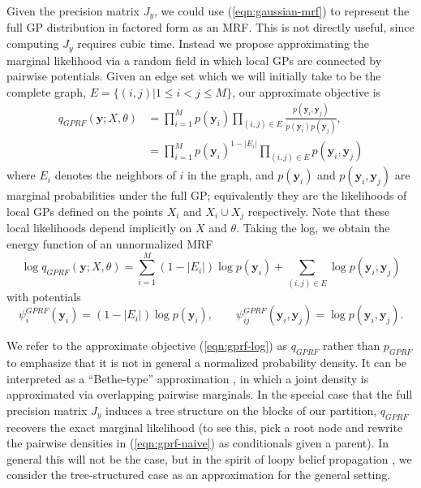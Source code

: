 \documentclass{article}
\renewcommand{\v}[1]{\mathbf{#1}}
\begin{document}
Given the precision matrix $J_y$, we could use
(\ref{eqn:gaussian-mrf}) to represent the full GP distribution in
factored form as an MRF. This is not directly useful, since computing
$J_y$ requires cubic time. Instead we propose approximating the
marginal likelihood via a random field in which local GPs are
connected by pairwise potentials. Given an edge set which we will
initially take to be the complete graph, $E =\{(i,j) | 1\le i < j \le
M\}$, our approximate objective is
\begin{align}
q_{GPRF}(\v{y}; X, \theta)&= \prod_{i=1}^M p(\v{y}_i) 
\prod_{(i,j)\in E} \frac{p(\v{y}_i, \v{y}_j)}{p(\v{y}_i) p(\v{y}_j)},\label{eqn:gprf-naive}\\
&= \prod_{i=1}^M p(\v{y}_i)^{1-|E_i|} \prod_{(i,j)\in E} p(\v{y}_i, \v{y}_j) \nonumber
\end{align}
where $E_i$ denotes the neighbors of $i$ in the graph, and $p(\v{y}_i)$ and $p(\v{y}_{i},
\v{y}_j)$ are marginal probabilities under the full GP;
equivalently they are the likelihoods of local GPs
defined on the points $X_i$ and $X_i \cup X_j$ respectively. Note that
these local likelihoods depend implicitly on $X$ and $\theta$. Taking
the log, we obtain the energy function of an unnormalized MRF
\begin{equation}
\log q_{GPRF}(\v{y}; X, \theta) = \sum_{i=1}^M (1-|E_i|)\log p(\v{y}_i)
 + \sum_{(i,j)\in E} \log p(\v{y}_i, \v{y}_j)  \label{eqn:gprf-log}
\end{equation}
with potentials
\begin{equation}
\psi_i^{GPRF}(\v{y}_i) = (1-|E_i|)\log p(\v{y}_i), \qquad \psi_{ij}^{GPRF}(\v{y}_i, \v{y}_j) =
\log p(\v{y}_i, \v{y}_j).\end{equation}

We refer to the approximate objective (\ref{eqn:gprf-log}) as
$q_{GPRF}$ rather than $p_{GPRF}$ to emphasize that it is not in
general a normalized probability density. It can be interpreted as a
``Bethe-type'' approximation \cite{yedidia2001bethe}, in which a joint
density is approximated via overlapping pairwise marginals. In the
special case that the full precision matrix $J_y$ induces a tree
structure on the blocks of our partition, $q_{GPRF}$ recovers the
exact marginal likelihood (to see this, pick a root node and rewrite
the pairwise densities in (\ref{eqn:gprf-naive}) as conditionals given
a parent). In general this will not be the case, but in the spirit of loopy
belief propagation \cite{murphy1999loopy}, we consider the
tree-structured case as an approximation for the general setting.
\end{document}
